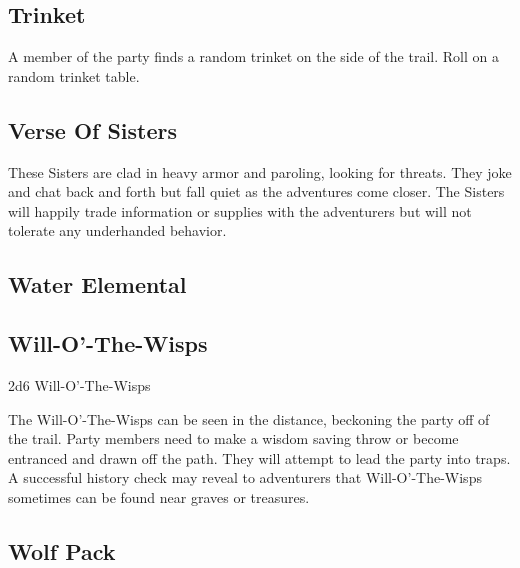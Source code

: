 \subsection{Trinket}

A member of the party finds a random trinket on the side of the trail.
Roll on a random trinket table.

\subsection{Verse Of Sisters}

These Sisters are clad in heavy armor and paroling, looking for threats.
They joke and chat back and forth but fall quiet as the adventures come closer.
The Sisters will happily trade information or supplies with the adventurers but will not tolerate any underhanded behavior.

\subsection{Water Elemental}

\subsection{Will-O'-The-Wisps}

2d6 Will-O'-The-Wisps

The Will-O'-The-Wisps can be seen in the distance, beckoning the party off of the trail.
Party members need to make a wisdom saving throw or become entranced and drawn off the path.
They will attempt to lead the party into traps.
A successful history check may reveal to adventurers that Will-O'-The-Wisps sometimes can be found near graves or treasures.

\subsection{Wolf Pack}
